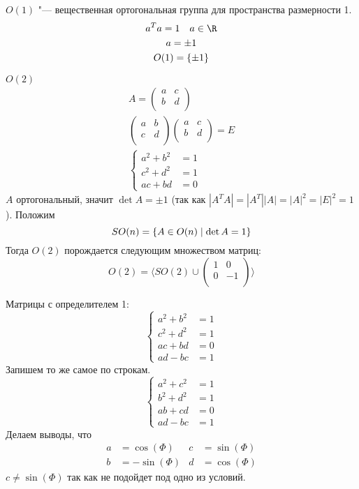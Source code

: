 \begin{exmp}
	$O(1)$ "--- вещественная ортогональная группа для пространства размерности 1.
	\begin{gather*}
		a^T a = 1 \quad a \in \R \\
		a = \pm 1 \\
		O(1) = \{\pm 1\}
	\end{gather*}
\end{exmp}
\begin{exmp}
	$O(2)$
	\begin{gather*}
		A = \begin{pmatrix} a & c \\ b & d \\ \end{pmatrix} \\
		\begin{pmatrix} a & b \\ c & d \\ \end{pmatrix} \begin{pmatrix} a & c \\ b & d \\ \end{pmatrix} = E \\
		\left\{\begin{aligned}
			a^2 + b^2 &= 1 \\
			c^2 + d^2 &= 1 \\
			a c + b d &= 0
		\end{aligned}\right.
	\end{gather*}
	$A$ ортогональный, значит $\det A = \pm 1$ (так как $|A^TA|=|A^T||A|=|A|^2=|E|^2=1$).
	Положим
	\[
		SO(n) = \{ A \in O(n) \mid \det A = 1\} \\
	\]
	Тогда $O(2)$ порождается следующим множеством матриц:
	\[
		O(2) = \langle SO(2) \cup \begin{pmatrix} 1 & 0 \\ 0 & -1 \\ \end{pmatrix} \rangle
	\]

	Матрицы с определителем 1:
	\[\left\{\begin{aligned}
		a^2 + b^2 &= 1 \\
		c^2 + d^2 &= 1 \\
		a c + b d &= 0 \\
		a d - b c &= 1
	\end{aligned}\right.\]
	Запишем то же самое по строкам.
	\[\left\{\begin{aligned}
		a^2 + c^2 &= 1 \\
		b^2 + d^2 &= 1 \\
		a b + c d &= 0 \\
		a d - b c &= 1
	\end{aligned}\right.\]
	Делаем выводы, что
	\begin{align*}
		a &=  \cos(\Phi) & c &= \sin(\Phi) \\
		b &= -\sin(\Phi) & d &= \cos(\Phi)
	\end{align*}
	$c \ne \sin(\Phi)$ так как не подойдет под одно из условий.


\end{exmp}

